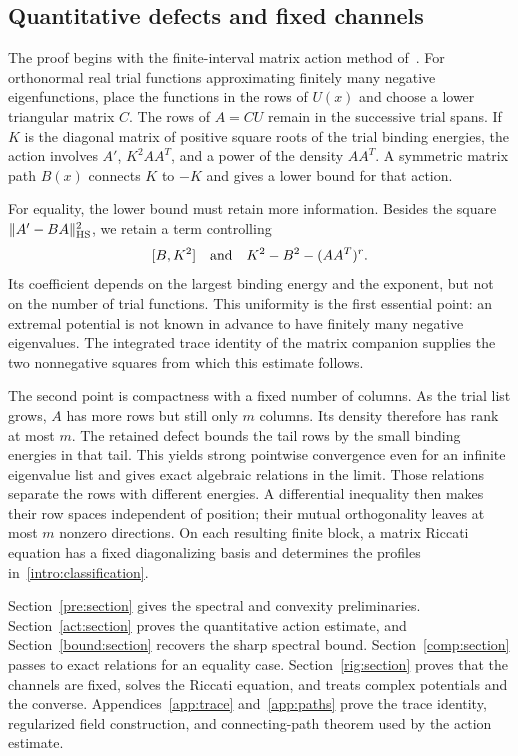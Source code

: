 \subsection{Quantitative defects and fixed channels}
The proof begins with the finite-interval matrix action method
of~\cite{MLT}. For orthonormal real trial functions approximating finitely
many negative eigenfunctions, place the functions in the rows of $U(x)$
and choose a lower triangular matrix $C$. The rows of $A=CU$ remain in the
successive trial spans.
If $K$ is the diagonal matrix of positive square roots of the trial
binding energies, the action involves $A'$, $K^2AA^T$, and a power of
the density $AA^T$. A symmetric matrix path $B(x)$ connects $K$ to
$-K$ and gives a lower bound for that action.

For equality, the lower bound must retain more information. Besides the
square $\|A'-BA\|_{\mathrm{HS}}^2$, we retain a term controlling
\[
 [B,K^2]\quad\hbox{and}\quad K^2-B^2-(AA^T)^r.
\]
Its coefficient depends on the largest binding energy and the exponent,
but not on the number of trial functions. This uniformity is the first
essential point: an extremal potential is not known in advance to have
finitely many negative eigenvalues. The integrated trace identity of the
matrix companion supplies the two nonnegative squares from which this
estimate follows.

The second point is compactness with a fixed number of columns. As the
trial list grows, $A$ has more rows but still only $m$ columns. Its
density therefore has rank at most $m$. The retained defect bounds the
tail rows by the small binding energies in that tail. This yields strong
pointwise convergence even for an infinite eigenvalue list and gives
exact algebraic relations in the limit. Those relations separate the
rows with different energies. A differential inequality then makes
their row spaces independent of position; their mutual orthogonality
leaves at most $m$ nonzero directions. On each resulting finite block,
a matrix Riccati equation has a fixed diagonalizing basis and determines
the profiles in~\eqref{intro:classification}.

Section~\ref{pre:section} gives the spectral and convexity preliminaries.
Section~\ref{act:section} proves the quantitative action estimate, and
Section~\ref{bound:section} recovers the sharp spectral bound.
Section~\ref{comp:section} passes to exact relations for an equality
case. Section~\ref{rig:section} proves that the channels are fixed,
solves the Riccati equation, and treats complex potentials and the
converse. Appendices~\ref{app:trace} and~\ref{app:paths} prove the trace
identity, regularized field construction, and connecting-path theorem
used by the action estimate.

